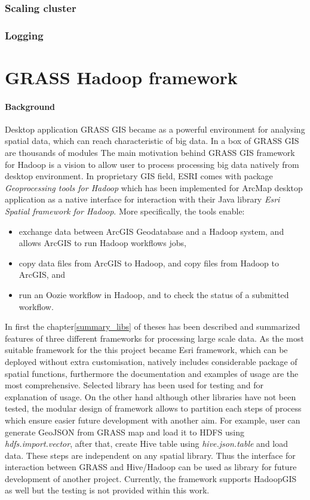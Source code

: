 \documentclass[a4paper,12pt,oneside]{report}
\begin{document}
            \subsubsection{Scaling cluster}
            \subsubsection{Logging}
 
 
 
        
\section{GRASS Hadoop framework}
\paragraph{Background}
Desktop application GRASS GIS became as a powerful environment for analysing spatial data, which can 
reach characteristic of big data. In a box of GRASS GIS are thousands of modules   The main motivation 
behind GRASS GIS framework for Hadoop is a vision to allow user to process processing big data natively from desktop environment. In proprietary GIS field, ESRI comes with package \textit{Geoprocessing tools for Hadoop}\cite{esri_gtfp} 
which has been implemented for ArcMap desktop application as a native interface for interaction with 
their Java library \textit{Esri Spatial framework for Hadoop}. More specifically, the tools enable:

\begin{itemize}
\item exchange data between ArcGIS Geodatabase and a Hadoop system, and allows ArcGIS to run Hadoop workflows jobs,
\item copy data files from ArcGIS to Hadoop, and copy files from Hadoop to ArcGIS, and 
\item run an Oozie workflow in Hadoop, and to check the status of a submitted workflow.
\end{itemize}
 
 
In first the chapter\ref{summary_libs} of theses has been described and summarized features of three different frameworks for processing large scale data. 
As the most suitable framework for the this project became Esri framework, which can be deployed without extra customisation, natively includes considerable package of spatial functions, furthermore the documentation  and examples of usage are  the most comprehensive. Selected library has been used for testing and for explanation of usage. On the other hand although other libraries have not been tested, the modular design of framework allows to partition each steps of process which ensure easier future development with another aim. For example, user can generate GeoJSON from GRASS map and load it  to HDFS using \textit{hdfs.import.vector}, after that, create Hive table using \textit{hive.json.table} and load data. These steps are independent on any spatial library. Thus the interface for interaction between GRASS and Hive/Hadoop can be used as library for future development of another project. Currently, the framework supports HadoopGIS as well but the testing is not provided within this work.
 
\end{document}
